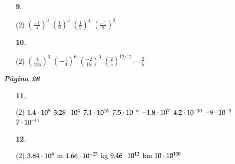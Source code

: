 \documentclass[a4paper, pdf, twoside]{book}
\begin{document}
\begin{multicols}{2}
\begin{enumerate}

 \item[\fontfamily{phv}\selectfont\color{blue}\textbf{9}. ] 
 \begin{tasks}[column-sep=1em, item-indent=1.3333em](2)
	 \task $\left (\frac {-1}{4}\right )^3$
	 \task $\left (\frac {1}{9}\right )^3$
	 \task $\left (\frac {1}{2}\right )^4$
	 \task $\left (\frac {-1}{5}\right )^3$
\end{tasks}
\vspace{0.25cm}



 \item[\fontfamily{phv}\selectfont\color{blue}\textbf{10}. ] 
 \begin{tasks}[column-sep=1em, item-indent=1.3333em](2)
	 \task $\left (\frac {4}{135}\right )^3$
	 \task $\left (-\frac {1}{4}\right )^6$
	 \task $\left (\frac {-2}{15}\right )^6$
	 \task $\left (\frac {2}{5}\right )^{12/12}=\frac {2}{5}$
\end{tasks}
 \end{enumerate}
\vspace{0.3cm}


{\textbf{\em Pàgina 26}} \hrulefill
\begin{enumerate}
\vspace{0.25cm}



 \item[\fontfamily{phv}\selectfont\color{blue}\textbf{11}. ] 
 \begin{tasks}[column-sep=1em, item-indent=1.3333em](2)
	 \task $1.4 \cdot 10^{8}$
	 \task $3.28 \cdot 10^{4}$
	 \task $7.1 \cdot 10^{16}$
	 \task $7.5 \cdot 10^{-6}$
	 \task $-1.8 \cdot 10^{7}$
	 \task $4.2 \cdot 10^{-10}$
	 \task $-9 \cdot 10^{-3}$
	 \task $7 \cdot 10^{-11}$
\end{tasks}
 \end{enumerate}
\begin{enumerate}
\vspace{0.25cm}



 \item[\fontfamily{phv}\selectfont\color{blue}\textbf{12}. ] 
 \begin{tasks}[column-sep=1em, item-indent=1.3333em](2)
	 \task $3.84 \cdot 10^{8}$ m
	 \task $1.66 \cdot 10^{-27}$ kg
	 \task $9.46 \cdot 10^{12}$ km
	 \task $10 \cdot 10^{100}$
\end{tasks}
\vspace{0.25cm}



\end{enumerate}
\end{multicols}
\end{document}
